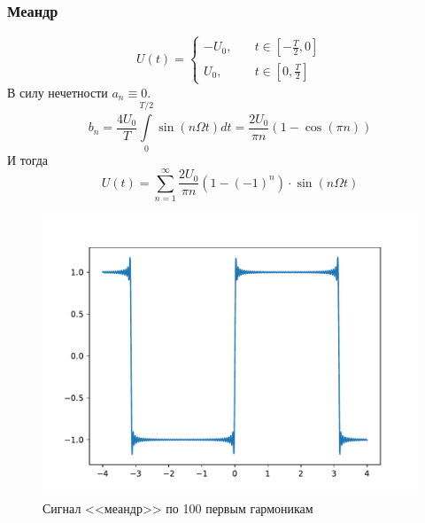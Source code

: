 \subsubsection{Меандр}
\begin{equation}
	U(t)=\left\{
	\begin{aligned}
		-U_0,\quad &t\in [-\frac{T}{2},0]\\
		U_0,\quad &t\in[0, \frac{T}{2}]
	\end{aligned}
	\right.
\end{equation}
В силу нечетности $a_n\equiv 0$.
\begin{equation}
	b_n=\frac{4U_0}{T}\int\limits_{0}^{T/2} \sin(n\Omega t)dt=\frac{2U_0}{\pi n}(1-\cos(\pi n))
\end{equation}
И тогда
\begin{equation}
	U(t)=\sum_{n=1}^{\infty}\frac{2U_0}{\pi n}(1-(-1)^n)\cdot\sin(n\Omega t)
\end{equation}
\begin{figure}[tb]
	\centering
	\includegraphics[]{plot/meandr}
	\caption{Сигнал <<меандр>> по 100 первым гармоникам}
	\label{fig:figure1}
\end{figure}

\newpage
